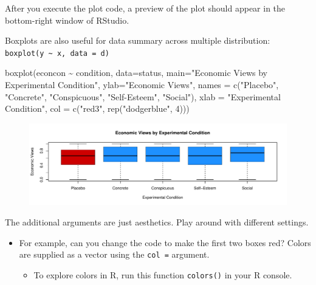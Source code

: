 \documentclass[
  letterpaper,
  DIV=11,
  numbers=noendperiod]{scrreprt}
\newenvironment{Shaded}{\begin{snugshade}}{\end{snugshade}}
\newcommand{\AttributeTok}[1]{\textcolor[rgb]{0.40,0.45,0.13}{#1}}
\newcommand{\DecValTok}[1]{\textcolor[rgb]{0.68,0.00,0.00}{#1}}
\newcommand{\FunctionTok}[1]{\textcolor[rgb]{0.28,0.35,0.67}{#1}}
\newcommand{\NormalTok}[1]{\textcolor[rgb]{0.00,0.23,0.31}{#1}}
\newcommand{\SpecialCharTok}[1]{\textcolor[rgb]{0.37,0.37,0.37}{#1}}
\newcommand{\StringTok}[1]{\textcolor[rgb]{0.13,0.47,0.30}{#1}}
\providecommand{\tightlist}{%
  \setlength{\itemsep}{0pt}\setlength{\parskip}{0pt}}\usepackage{longtable,booktabs,array}
\begin{document}
After you execute the plot code, a preview of the plot should appear in
the bottom-right window of RStudio.

Boxplots are also useful for data summary across multiple distribution:
\texttt{boxplot(y\ \textasciitilde{}\ x,\ data\ =\ d)}

\begin{Shaded}
\begin{Highlighting}[]
\FunctionTok{boxplot}\NormalTok{(econcon }\SpecialCharTok{\textasciitilde{}}\NormalTok{ condition, }\AttributeTok{data=}\NormalTok{status,}
        \AttributeTok{main=}\StringTok{"Economic Views by Experimental Condition"}\NormalTok{,}
        \AttributeTok{ylab=}\StringTok{"Economic Views"}\NormalTok{,}
        \AttributeTok{names =} \FunctionTok{c}\NormalTok{(}\StringTok{"Placebo"}\NormalTok{, }\StringTok{"Concrete"}\NormalTok{, }\StringTok{"Conspicuous"}\NormalTok{, }
                  \StringTok{"Self{-}Esteem"}\NormalTok{, }\StringTok{"Social"}\NormalTok{),}
        \AttributeTok{xlab =} \StringTok{"Experimental Condition"}\NormalTok{,}
        \AttributeTok{col =} \FunctionTok{c}\NormalTok{(}\StringTok{"red3"}\NormalTok{, }\FunctionTok{rep}\NormalTok{(}\StringTok{"dodgerblue"}\NormalTok{, }\DecValTok{4}\NormalTok{)))}
\end{Highlighting}
\end{Shaded}

\begin{figure}[H]

{\centering \includegraphics{04-Visualization_files/figure-pdf/unnamed-chunk-5-1.pdf}

}

\end{figure}

The additional arguments are just aesthetics. Play around with different
settings.

\begin{itemize}
\tightlist
\item
  For example, can you change the code to make the first two boxes red?
  Colors are supplied as a vector using the \texttt{col\ =} argument.

  \begin{itemize}
  \tightlist
  \item
    To explore colors in R, run this function \texttt{colors()} in your
    R console.
  \end{itemize}
\end{itemize}
\end{document}
